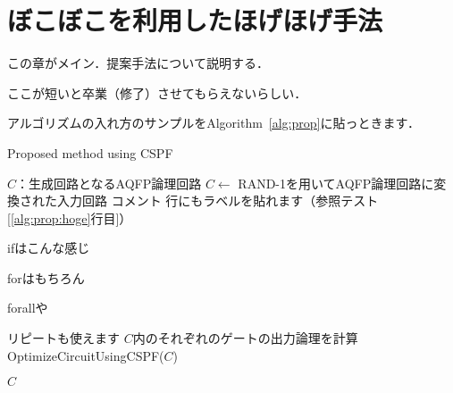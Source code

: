\chapter{ぼこぼこを利用したほげほげ手法}
この章がメイン．提案手法について説明する．

ここが短いと卒業（修了）させてもらえないらしい．

アルゴリズムの入れ方のサンプルをAlgorithm~\ref{alg:prop}に貼っときます．
\begin{algorithm}[tbp]
 \caption{Proposed method using CSPF}\label{alg:prop}
 \begin{algorithmic}[1]
  \Require $C$：生成回路となるAQFP論理回路
  \State $C \gets$ RAND-1を用いてAQFP論理回路に変換された入力回路
  \State コメント 
  \State 行にもラベルを貼れます（参照テスト[\ref{alg:prop:hoge}行目]） \label{alg:prop:hoge}

  \State ifはこんな感じ
  \State \Return \True
  \State \Return \False
  \EndIf

  \State forはもちろん
  \EndFor

  \State forallや
  \EndFor

  \Repeat
  \State リピートも使えます
  \State $C$内のそれぞれのゲートの出力論理を計算
  \State OptimizeCircuitUsingCSPF($C$)

  \State \Return $C$
 \end{algorithmic}
\end{algorithm}
